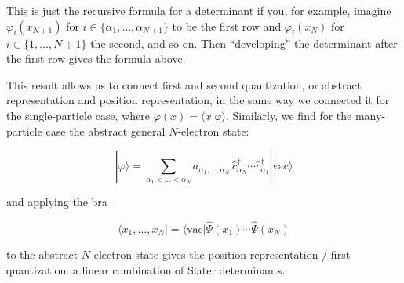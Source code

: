 This is just the recursive formula for a determinant if you, for
example, imagine $\varphi_i(x_{N+1})$ for $i\in\{\alpha_1,\dots,\alpha_{N+1}\}$
to be the first row and $\varphi_i(x_N)$ for $i\in\{1,\dots,N+1\}$ the
second, and so on. Then ``developing'' the determinant after the first
row gives the formula above.

This result allows us to connect first and second quantization, or
abstract representation and position representation, in the same way we
connected it for the single-particle case, where $\varphi(x) = \langle x|\varphi\rangle$.
Similarly, we find for the many-particle case the abstract general
$N$-electron state:

\begin{equation}
\boxed{|\varphi\rangle = \sum_{\alpha_1<\dots<\alpha_N} a_{\alpha_1,\dots,\alpha_N}\,\hat c_{\alpha_N}^\dagger\cdots\hat c_{\alpha_1}^\dagger|\mathrm{vac}\rangle}
\end{equation}

and applying the bra

\begin{equation}
\boxed{\langle x_1,\dots,x_N| = \langle\mathrm{vac}|\hat\varPsi(x_1)\cdots\hat\varPsi(x_N)}
\end{equation}

to the abstract $N$-electron state gives the position
representation / first quantization: a linear combination of Slater
determinants.